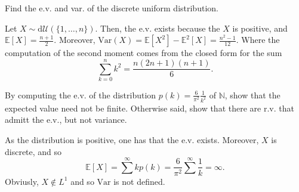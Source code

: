 \begin{my_ex}
	Find the e.v. and var. of the discrete uniform distribution.
\end{my_ex}
\begin{my_remark}
	Let $X\sim\mathrm{d}\mathcal{U}(\{1,\dots,n\})$. Then, the e.v. exists because the $X$ is positive, and $\mathbb{E}[X] = \frac{n+1}{2}$. Moreover, $\mathrm{Var}(X)=\mathbb{E}[X^2]-\mathbb{E}^2[X]=\frac{n^2-1}{12}$. Where the computation of the second moment comes from the closed form for the sum
	\[
	\sum^n_{k=0}  k^2 = \frac{n(2n+1)(n+1)}{6}.
	\]
\end{my_remark}

\begin{my_ex}
	By computing the e.v. of the distribution $p(k)=\frac{6}{\pi^2}\frac{1}{k^2}$ of $\mathbb{N}$, show that the expected value need not be finite. Otherwise said, show that there are r.v. that admitt the e.v., but not variance.
\end{my_ex}
\begin{my_remark}
	As the distribution is positive, one has that the e.v. exists. Moreover, $X$ is discrete, and so
	\[
		\mathbb{E}[X] = \sum ^ \infty k p(k) = \frac{6}{\pi^2} \sum^\infty \frac{1}{k} = \infty.	
	\]
	Obviusly, $X \notin L^1$ and so $\mathrm{Var}$ is not defined.
\end{my_remark}